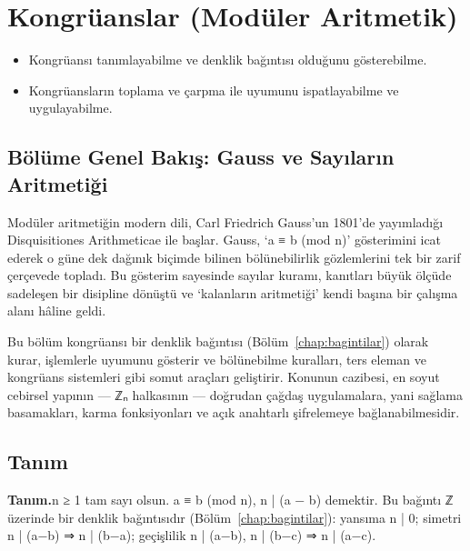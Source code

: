 \chapter{Kongrüanslar (Modüler Aritmetik)}
\label{chap:kongruanslar}


\par{}\nopagebreak

\begin{itemize}\setlength{\itemsep}{2pt}\setlength{\parskip}{0pt}
\item Kongrüansı tanımlayabilme ve denklik bağıntısı olduğunu gösterebilme.
\item Kongrüansların toplama ve çarpma ile uyumunu ispatlayabilme ve uygulayabilme.
\end{itemize}

\section*{Bölüme Genel Bakış: Gauss ve Sayıların Aritmetiği}

Modüler aritmetiğin modern dili, Carl Friedrich Gauss’un 1801’de yayımladığı Disquisitiones Arithmeticae ile başlar. Gauss, ‘a ≡ b (mod n)’ gösterimini icat ederek o güne dek dağınık biçimde bilinen bölünebilirlik gözlemlerini tek bir zarif çerçevede topladı. Bu gösterim sayesinde sayılar kuramı, kanıtları büyük ölçüde sadeleşen bir disipline dönüştü ve ‘kalanların aritmetiği’ kendi başına bir çalışma alanı hâline geldi.

Bu bölüm kongrüansı bir denklik bağıntısı (Bölüm~\ref{chap:bagintilar}) olarak kurar, işlemlerle uyumunu gösterir ve bölünebilme kuralları, ters eleman ve kongrüans sistemleri gibi somut araçları geliştirir. Konunun cazibesi, en soyut cebirsel yapının — ℤₙ halkasının — doğrudan çağdaş uygulamalara, yani sağlama basamakları, karma fonksiyonları ve açık anahtarlı şifrelemeye bağlanabilmesidir.

\section{Tanım}

\begin{tcolorbox}[bookbox,colback=cDef]\textbf{\textsf{\textcolor{cAcc}{Tanım.}}}\quad n ≥ 1 tam sayı olsun. a ≡ b (mod n), n | (a − b) demektir. Bu bağıntı ℤ üzerinde bir denklik bağıntısıdır (Bölüm~\ref{chap:bagintilar}): yansıma n | 0; simetri n | (a−b) ⇒ n | (b−a); geçişlilik n | (a−b), n | (b−c) ⇒ n | (a−c).\end{tcolorbox}

